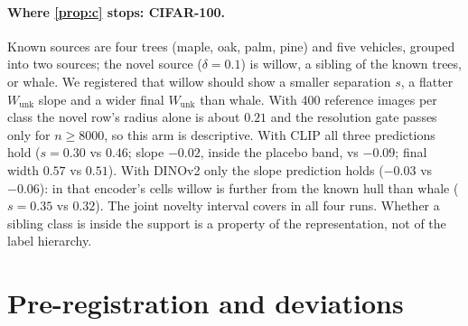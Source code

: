 \documentclass[twoside]{article}
\newcommand{\Wunk}{\ensuremath{W_{\mathrm{unk}}}}
\begin{document}
\paragraph{Where \cref{prop:c} stops: CIFAR-100.} Known sources are four trees (maple, oak, palm, pine)
and five vehicles, grouped into two sources; the novel source ($\delta=0.1$) is willow, a sibling of
the known trees, or whale. We registered that willow should show a smaller separation $s$, a flatter
$\Wunk$ slope and a wider final $\Wunk$ than whale. With 400 reference images per class the novel
row's radius alone is about $0.21$ and the resolution gate passes only for $n\ge8000$, so this arm is
descriptive. With CLIP all three predictions hold ($s=0.30$ vs $0.46$; slope $-0.02$, inside the
placebo band, vs $-0.09$; final width $0.57$ vs $0.51$). With DINOv2 only the slope prediction holds
($-0.03$ vs $-0.06$): in that encoder's cells willow is further from the known hull than whale
($s=0.35$ vs $0.32$). The joint novelty interval covers in all four runs. Whether a sibling class is
inside the support is a property of the representation, not of the label hierarchy.

\section{Pre-registration and deviations}
\label{app:deviations}
\end{document}
